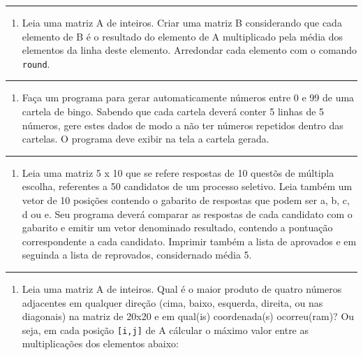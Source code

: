\documentclass[12pt,a4paper]{article}
\renewcommand{\linethickness}{0.05em}
\providecommand{\tightlist}{%
      \setlength{\itemsep}{0pt}\setlength{\parskip}{0pt}}
\begin{document}
    \begin{center}\rule{0.5\linewidth}{\linethickness}\end{center}

\begin{enumerate}
\def\labelenumi{\arabic{enumi}.}
\setcounter{enumi}{2}
\tightlist
\item
  Leia uma matriz A de inteiros. Criar uma matriz B considerando que
  cada elemento de B é o resultado do elemento de A multiplicado pela
  média dos elementos da linha deste elemento. Arredondar cada elemento
  com o comando \texttt{round}.
\end{enumerate}

    \begin{center}\rule{0.5\linewidth}{\linethickness}\end{center}

\begin{enumerate}
\def\labelenumi{\arabic{enumi}.}
\setcounter{enumi}{3}
\tightlist
\item
  Faça um programa para gerar automaticamente números entre 0 e 99 de
  uma cartela de bingo. Sabendo que cada cartela deverá conter 5 linhas
  de 5 números, gere estes dados de modo a não ter números repetidos
  dentro das cartelas. O programa deve exibir na tela a cartela gerada.
\end{enumerate}

    \begin{center}\rule{0.5\linewidth}{\linethickness}\end{center}

\begin{enumerate}
\def\labelenumi{\arabic{enumi}.}
\setcounter{enumi}{4}
\tightlist
\item
  Leia uma matriz 5 x 10 que se refere respostas de 10 questõs de
  múltipla escolha, referentes a 50 candidatos de um processo seletivo.
  Leia também um vetor de 10 posições contendo o gabarito de respostas
  que podem ser a, b, c, d ou e. Seu programa deverá comparar as
  respostas de cada candidato com o gabarito e emitir um vetor
  denominado resultado, contendo a pontuação correspondente a cada
  candidato. Imprimir também a lista de aprovados e em seguinda a lista
  de reprovados, considernado média 5.
\end{enumerate}

    \begin{center}\rule{0.5\linewidth}{\linethickness}\end{center}

\begin{enumerate}
\def\labelenumi{\arabic{enumi}.}
\setcounter{enumi}{5}
\tightlist
\item
  Leia uma matriz A de inteiros. Qual é o maior produto de quatro
  números adjacentes em qualquer direção (cima, baixo, esquerda,
  direita, ou nas diagonais) na matriz de 20x20 e em qual(is)
  coordenada(s) ocorreu(ram)? Ou seja, em cada posição
  \texttt{{[}i,j{]}} de A cálcular o máximo valor entre as
  multiplicações dos elementos abaixo:
\end{enumerate}
\end{document}
